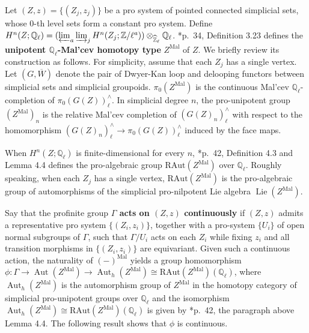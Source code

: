 \documentclass[11pt]{amsart}
\theoremstyle{definition}
\numberwithin{equation}{section}
\numberwithin{equation}{section}
\newcommand\QQ{\mathbb{Q}}
\newcommand\ZZ{\mathbb{Z}}
\DeclareMathOperator{\Aut}{Aut}
\DeclareMathOperator{\Lie}{Lie}
\begin{document}
Let $(Z,z)=\{(Z_j,z_j)\}$ be a pro system of pointed connected simplicial sets, whose $0$-th level sets form a constant pro system. Define $H^n(Z;\QQ_{\ell})=(\varprojlim_a\varinjlim_j H^n(Z_j;\ZZ/\ell^{a}))\otimes_{\widehat{\ZZ}_{\ell}} \QQ_{\ell}$. \cite{Pridham-Galois-actions-on-homotopy-groups-algebraic-varieties}*{p.~34, Definition 3.23} defines the \textbf{unipotent $\QQ_{\ell}$-Mal'cev homotopy type} $Z^{\mathrm{Mal}}$ of $Z$. We briefly review its construction as follows. For simplicity, assume that each $Z_j$ has a single vertex. Let $(G,\overline{W})$ denote the pair of Dwyer-Kan loop and  delooping functors between simplicial sets and simplicial groupoids. $\pi_0(Z^{\mathrm{Mal}})$ is the continuous Mal'cev $\QQ_{\ell}$-completion of $\pi_0(G(Z))^{\wedge}_{\ell}$. In simplicial degree $n$, the pro-unipotent group $(Z^{\mathrm{Mal}})_n$ is the relative Mal'cev completion of $(G(Z)_{n})^{\wedge}_{\ell}$ with respect to the homomorphism $(G(Z)_{n})^{\wedge}_{\ell}\rightarrow \pi_0(G(Z))^{\wedge}_{\ell}$ induced by the face maps.

When $H^n(Z;\QQ_{\ell})$ is finite-dimensional for every $n$, \cite{Pridham-Galois-actions-on-homotopy-groups-algebraic-varieties}*{p.~42, Definition 4.3 and Lemma 4.4} defines the pro-algebraic group $\mathrm{RAut}(Z^{\mathrm{Mal}})$ over $\QQ_{\ell}$. Roughly speaking, when each $Z_j$ has a single vertex, $\mathrm{RAut}(Z^{\mathrm{Mal}})$ is the pro-algebraic group of automorphisms of the simplicial pro-nilpotent Lie algebra $\Lie(Z^{\mathrm{Mal}})$.
 
Say that the profinite group \textbf{$\Gamma$ acts on $(Z,z)$ continuously} if $(Z,z)$ admits a representative pro system $\{(Z_i,z_i)\}$,  together with a pro-system $\{U_i\}$ of open normal subgroups of $\Gamma$, such that $\Gamma/U_i$ acts on each $Z_i$ while fixing $z_i$ and all transition morphisms in $\{(Z_i,z_i)\}$ are equivariant. Given such a continuous action, the naturality of $(-)^{\mathrm{Mal}}$ yields a group homomorphism $\phi: \Gamma\rightarrow \Aut(Z^{\mathrm{Mal}})\rightarrow \Aut_h(Z^{\mathrm{Mal}})\cong \mathrm{RAut}(Z^{\mathrm{Mal}})(\QQ_{\ell})$, where $\Aut_h(Z^{\mathrm{Mal}})$ is the automorphism group of $Z^{\mathrm{Mal}}$ in the homotopy category of simplicial pro-unipotent groups over $\QQ_{\ell}$ and the isomorphism $\Aut_h(Z^{\mathrm{Mal}})\cong \mathrm{RAut}(Z^{\mathrm{Mal}})(\QQ_{\ell})$ is given by \cite{Pridham-Galois-actions-on-homotopy-groups-algebraic-varieties}*{p.~42, the paragraph above Lemma 4.4}. The following result shows that $\phi$ is continuous.
\end{document}
